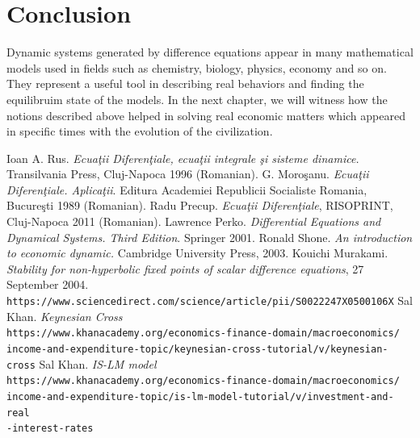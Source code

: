 \documentclass[a4paper, 11pt]{report}
\begin{document}
\section{Conclusion}
Dynamic systems generated by difference equations appear in many mathematical models used in fields such as chemistry, biology, physics, economy and so on. They represent a useful tool in describing real behaviors and finding the equilibruim state of the models. In the next chapter, we will witness how the notions described above helped in solving real economic matters which appeared in specific times with the evolution of the civilization.
\begin{thebibliography}{9}
 Ioan A. Rus. \textit{Ecua\c{t}ii Diferen\c{t}iale, ecua\c{t}ii integrale \c{s}i sisteme dinamice.} Transilvania Press, Cluj-Napoca 1996 (Romanian).
 G. Moro\c{s}anu. \textit{Ecua\c{t}ii Diferen\c{t}iale. Aplica\c{t}ii}. Editura Academiei Republicii Socialiste Romania, Bucure\c{s}ti 1989 (Romanian).
 Radu Precup. \textit{Ecua\c{t}ii Diferen\c{t}iale}, RISOPRINT, Cluj-Napoca 2011 (Romanian).
 Lawrence Perko. \textit{Differential Equations and Dynamical Systems. Third Edition}. Springer 2001.
 Ronald Shone. \textit{An introduction to economic dynamic.} Cambridge University Press, 2003.
 Kouichi Murakami. \textit{Stability for non-hyperbolic fixed points of scalar difference equations}, 27 September 2004.
 \\\texttt{https://www.sciencedirect.com/science/article/pii/S0022247X0500106X}
 Sal Khan. \textit{Keynesian Cross}
 \\\texttt{https://www.khanacademy.org/economics-finance-domain/macroeconomics/\\income-and-expenditure-topic/keynesian-cross-tutorial/v/keynesian-cross}
 Sal Khan. \textit{IS-LM model}
 \\\texttt{https://www.khanacademy.org/economics-finance-domain/macroeconomics/\\income-and-expenditure-topic/is-lm-model-tutorial/v/investment-and-real\\-interest-rates}
\end{thebibliography}
\end{document}
